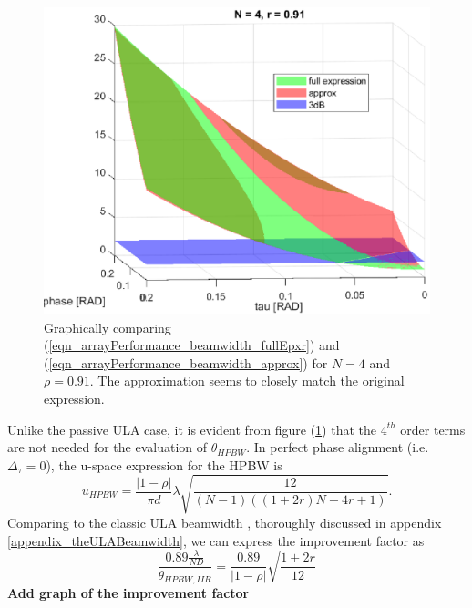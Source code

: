 \begin{figure}
    \label{fig_singleFreqFeedback_2ndTaylorNumericalValidation}
    \centering
    \includegraphics[width=0.9\linewidth]{./Media/spatial_IIR_MATLAB/beamwidth/BW_approx_validation.eps}
    \caption{Graphically comparing (\ref{eqn_arrayPerformance_beamwidth_fullEpxr}) and (\ref{eqn_arrayPerformance_beamwidth_approx}) for $N=4$ and $\rho=0.91$. The approximation seems to closely match the original expression.}
\end{figure}
Unlike the passive ULA case, it is evident from figure (\ref{fig_singleFreqFeedback_2ndTaylorNumericalValidation}) that the $4^{th}$ order terms are not needed for the evaluation of $\theta_{HPBW}$. In perfect phase alignment (i.e. $\Delta_{\tau}=0$), the u-space expression for the HPBW is $$u_{HPBW} =
\frac{
\left|1-\rho\right|
}{
\pi{d}
}
\lambda
\sqrt{\frac{
12
}{
\left(N-1\right)\left(\left(1+2r\right)N-4r+1\right)
}}.
$$
Comparing to the classic ULA beamwidth \cite{VanTrees2002DetectionIV}, thoroughly discussed in appendix \ref{appendix_theULABeamwidth}, we can express the improvement factor as
$$
\frac{
0.89\frac{\lambda}{ND}
}{
\theta_{HPBW,IIR}
}
=
\frac{0.89}{\left|1-\rho\right|}\sqrt{\frac{1+2r}{12}}
$$
\textbf{Add graph of the improvement factor}
